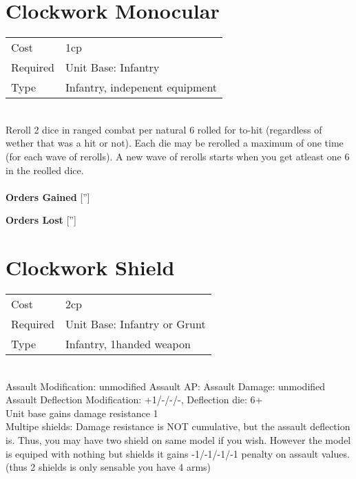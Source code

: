 






\pagebreak\section{ Clockwork Monocular }

\begin{tabular}{ll}
    Cost & 1cp \\
    Required & Unit Base: Infantry\\
    Type & Infantry, indepenent equipment\\
\end{tabular}
\ \\
Reroll 2 dice in ranged combat per natural 6 rolled for to-hit (regardless of wether that was a hit or not). Each die may be rerolled a maximum of one time (for each wave of rerolls). A new wave of rerolls starts when you get atleast one 6 in the reolled dice. \\

\ \\

{\bf Orders Gained}
['']

{\bf Orders Lost}
['']
\section{ Clockwork Shield }

\begin{tabular}{ll}
    Cost & 2cp \\
    Required & Unit Base: Infantry or Grunt\\
    Type & Infantry, 1handed weapon\\
\end{tabular}
\ \\
Assault Modification: unmodified Assault AP:  Assault Damage: unmodified\\
Assault Deflection Modification: +1/-/-/-, Deflection die: 6+ \\


Unit base gains damage resistance 1\\ Multipe shields: Damage resistance is NOT cumulative, but the assault deflection is. Thus, you may have two shield on same model if you wish. However the model is equiped with nothing but shields it gains -1/-1/-1/-1 penalty on assault values. (thus 2 shields is only sensable you have 4 arms)

